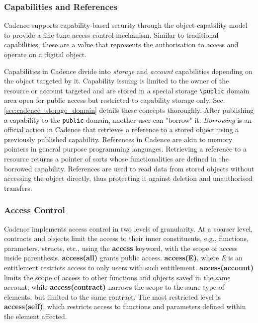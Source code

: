 \documentclass[../NFTComp_IEEE.tex]{subfiles}
\begin{document}
\subsubsection{Capabilities and References}
\label{sec:cadence_capabilities}
Cadence supports capability-based security through the object-capability model to provide a fine-tune access control mechanism. Similar to traditional capabilities, these are a value that represents the authorisation to access and operate on a digital object.
\par
Capabilities in Cadence divide into \textit{storage} and \textit{account} capabilities depending on the object targeted by it. Capability issuing is limited to the owner of the resource or account targeted and are stored in a special storage \verb|\public| domain area open for public access but restricted to capability storage only. Sec. \ref{sec:cadence_storage_domain} details these concepts thoroughly. After publishing a capability to the \verb|public| domain, another user can "borrow" it. \textit{Borrowing} is an official action in Cadence that retrieves a reference to a stored object using a previously published capability. References in Cadence are akin to memory pointers in general purpose programming languages. Retrieving a reference to a resource returns a pointer of sorts whose functionalities are defined in the borrowed capability. References are used to read data from stored objects without accessing the object directly, thus protecting it against deletion and unauthorised transfers.

\subsubsection{Access Control}
Cadence implements access control in two levels of granularity. At a coarser level, contracts and objects limit the access to their inner constituents, e.g., functions, parameters, structs, etc., using the \textbf{access} keyword, with the scope of access inside parenthesis. \textbf{access(all)} grants public access. \textbf{access(E)}, where \textit{E} is an entitlement restricts access to only users with such entitlement. \textbf{access(account)} limits the scope of access to other functions and objects saved in the same account, while \textbf{access(contract)} narrows the scope to the same type of elements, but limited to the same contract. The most restricted level is \textbf{access(self)}, which restricts access to functions and parameters defined within the element affected.
\end{document}
